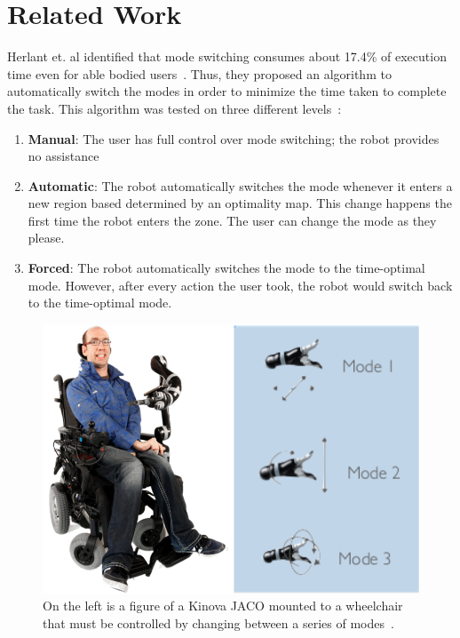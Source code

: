 \section{Related Work}
\label{sec:related_work}

Herlant et. al identified that mode switching consumes about 17.4\% of execution time even for able bodied users~\cite{herlant2016assistive}. Thus, they proposed an algorithm to automatically switch the modes in order to minimize the time taken to complete the task. This algorithm was tested on three different levels~\cite{herlant2016assistive}:
\begin{enumerate}
    \item \textbf{Manual}: The user has full control over mode switching; the robot provides no assistance
    \item \textbf{Automatic}: The robot automatically switches the mode whenever it enters a new region based determined by an optimality map. This change happens the first time the robot enters the zone. The user can change the mode as they please.
    \item \textbf{Forced}: The robot automatically switches the mode to the time-optimal mode. However, after every action the user took, the robot would switch back to the time-optimal mode.
\end{enumerate}

\begin{figure}[t!]
    \includegraphics[width=\columnwidth]{figs/kinova}
    \caption{On the left is a figure of a Kinova JACO mounted to a wheelchair~\protect\cite{kinova} that must be controlled by changing between a series of modes~\protect\cite{modes}.}
    \label{fig:kinova}
\end{figure}

